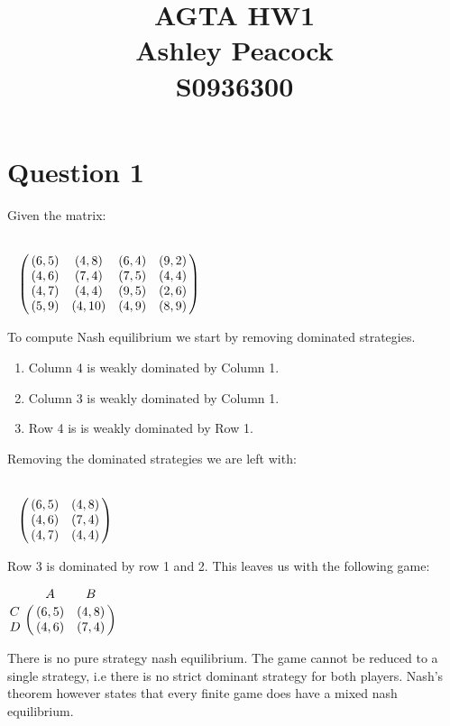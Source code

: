 \documentclass[11pt]{report}
\begin{document}
\title{AGTA HW1 \\ Ashley Peacock \\ S0936300}

\maketitle

\section{Question 1}

Given the matrix: 

\begin{center}
$ \bordermatrix{~ & ~    & ~    & ~ & ~    \cr 
				~ & (6, 5) & (4, 8) & (6, 4) & (9, 2) \cr 
				~ & (4, 6) & (7, 4) & (7, 5) & (4, 4) \cr
				~ & (4, 7) & (4, 4) & (9, 5) & (2, 6) \cr
				~ & (5, 9) & (4, 10)& (4, 9) & (8, 9) \cr}$ 
\end{center}
				
To compute Nash equilibrium we start by removing dominated strategies.

\begin{enumerate}
\item Column 4 is weakly dominated by Column 1.
\item Column 3 is weakly dominated by Column 1.
\item Row 4 is is weakly dominated by Row 1.
\end{enumerate}

Removing the dominated strategies we are left with:

\begin{center}
$\bordermatrix{~ & ~      & ~  \cr
			   ~ & (6, 5) & (4, 8) \cr
			   ~ & (4, 6) & (7, 4) \cr
			   ~ & (4, 7) & (4, 4) \cr} $
\end{center}
			   
Row 3 is dominated by row 1 and 2. This leaves us with the following game:

\begin{center}
$\bordermatrix{~ & A      & B  \cr
			   C & (6, 5) & (4, 8) \cr
			   D & (4, 6) & (7, 4) \cr} $
\end{center}

There is no pure strategy nash equilibrium. The game cannot be reduced to a single strategy, i.e there is no strict dominant strategy for both players. Nash's theorem however states that every finite game does have a mixed nash equilibrium.
\end{document}
